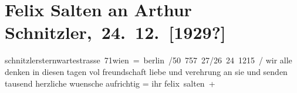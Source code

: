 

         
         \renewcommand{\erwaehntePersonen}{Personen: Felix Salten}
         \renewcommand{\erwaehnteOrte}{Orte: Berlin, Sternwartestraße 71, Wien}
         \renewcommand{\erwaehnteWerke}{}
               \section[ Felix Salten an Arthur Schnitzler, 24. 12. {[}1929?{]}]{ Felix Salten an Arthur Schnitzler, 24. 12. {[}1929?{]}}\nopagebreak{}\rehead{ }\begin{ledgroupsized}[t]{13cm}\normalsize\beginnumbering{} \toendnotes[C]{\smallbreak\pagebreak[2]} 
\pstart{}{\pb}schnitzler\pend{}\pstart{}sternwartestrasse 71\pend{}\pstart{}wien =\pend{}{\bigskip} berlin /50 757 27/26 24 1215 /\pend
           \pstart
           wir alle denken in diesen tagen vol freundschaft liebe und verehrung an sie und
               senden tausend herzliche wuensche aufrichtig = ihr \spacefill\mbox{felix salten +}\pend
           
         
         \endnumbering{}\end{ledgroupsized}  \newcommand{\dateiname}{L03590}\newcommand{\titel}{Felix Salten an Arthur Schnitzler, 24. 12. [1929?]}\newcommand{\editorInnen}{Martin Anton Müller und Laura Untner}
      
